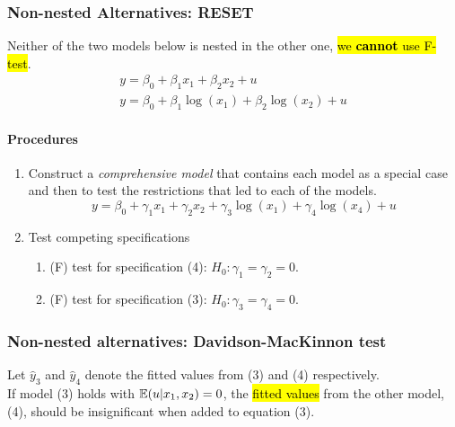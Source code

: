 \documentclass[]{article}
\begin{document}
			
		\subsubsection{Non-nested Alternatives: RESET}
			\par Neither of the two models below is nested in the other one, \hl{we \textbf{cannot} use F-test}.
			\begin{gather}
				y = \beta_0 + \beta_1 x_1 + \beta_2 x_2 + u \\
				y = \beta_0 + \beta_1 \log(x_1) + \beta_2 \log(x_2) + u
			\end{gather}
			\paragraph{Procedures}
			\begin{enumerate}
				\item Construct a \emph{comprehensive model} that contains each model as a special case and then to test the restrictions that led to each of the models.
				\begin{equation}
					y = \beta_0 + \gamma_1 x_1 + \gamma_2 x_2 + \gamma_3 \log(x_1) + \gamma_4 \log(x_4) + u
				\end{equation}
				\item Test competing specifications
				\begin{enumerate}
					\item (F) test for specification (4): $H_0: \gamma_1 = \gamma_2 = 0$.
					\item (F) test for specification (3): $H_0: \gamma_3 = \gamma_4 = 0$.
				\end{enumerate}
			\end{enumerate}
			
			
		\subsubsection{Non-nested alternatives: Davidson-MacKinnon test}
			\par Let $\hat{y}_3$ and $\hat{y}_4$ denote the fitted values from (3) and (4) respectively. \\
			If model (3) holds with $\mathbb{E}({u|x_1, x_2})=0$, the \hl{fitted values} from the other model, (4), should be insignificant when added to equation (3).
			
\end{document}
